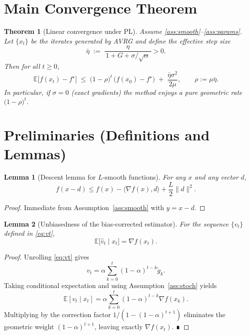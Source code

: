 \documentclass{article}
\newtheorem{theorem}{Theorem}[section]
\newtheorem{lemma}{Lemma}[section]
\begin{document}
\section*{Main Convergence Theorem}
\begin{theorem}[Linear convergence under PL]\label{thm:linear}
Assume \ref{ass:smooth}–\ref{ass:params}.  Let $\{x_t\}$ be the iterates
generated by AVRG and define the \emph{effective step size}
\[
\bar\eta \;:=\; \frac{\eta}{\,1+G+\sigma/\sqrt{\alpha}\,}>0 .
\]
Then for all $t\ge 0$,
\[
\mathbb{E}\!\bigl[f(x_{t})-f^\star\bigr]
\;\le\;
\bigl(1-\rho\bigr)^{t}\,\bigl(f(x_{0})-f^\star\bigr)
\;+\;
\frac{\bar\eta\sigma^2}{2\mu},
\qquad
\rho:=\mu\bar\eta .
\]
In particular, if $\sigma=0$ (exact gradients) the method enjoys a pure
geometric rate $\bigl(1-\rho\bigr)^{t}$.
\end{theorem}

\section*{Preliminaries (Definitions and Lemmas)}
\begin{lemma}[Descent lemma for $L$‑smooth functions]\label{lem:descent}
For any $x$ and any vector $d$,
\[
f(x-d)\le f(x)-\langle\nabla f(x),d\rangle+\frac{L}{2}\|d\|^2 .
\]
\end{lemma}
\begin{proof}
Immediate from Assumption~\ref{ass:smooth} with $y=x-d$.
\end{proof}

\begin{lemma}[Unbiasedness of the bias‑corrected estimator]\label{lem:bias}
For the sequence $\{v_t\}$ defined in \eqref{eq:vt},
\[
\mathbb{E}\!\bigl[\hat v_t\mid x_t\bigr]=\nabla f(x_t).
\]
\end{lemma}
\begin{proof}
Unrolling \eqref{eq:vt} gives
\[
v_t=\alpha\sum_{k=0}^{t}(1-\alpha)^{t-k}\tilde g_k .
\]
Taking conditional expectation and using Assumption~\ref{ass:stoch} yields
\[
\mathbb{E}[v_t\mid x_t]=\alpha\sum_{k=0}^{t}(1-\alpha)^{t-k}\nabla f(x_k).
\]
Multiplying by the correction factor $1/(1-(1-\alpha)^{t+1})$ eliminates the
geometric weight $(1-\alpha)^{t+1}$, leaving exactly $\nabla f(x_t)$.  ∎
\end{proof}
\end{document}
